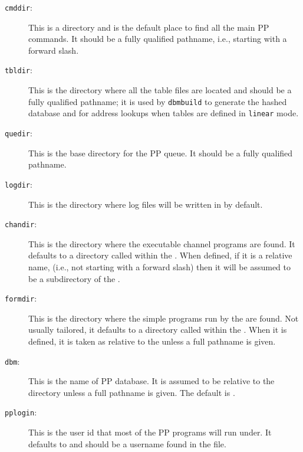 \begin{description}
\item[\verb+cmddir+:]
This is a directory and is the default place to find all the main PP
commands. It should be a fully qualified pathname, i.e., starting with
a forward slash.

\item[\verb+tbldir+:]
This is the directory where all the table files are located and should
be a fully qualified pathname; it is used by
\verb+dbmbuild+ to generate the hashed database and
for address lookups when tables are defined in
\verb+linear+ mode.

\item[\verb+quedir+:]
This is the base directory for the PP queue. It should be a fully
qualified pathname.

\item[\verb+logdir+:]
This is the directory where log files will be written in by default.


\item[\verb+chandir+:]
This is the directory where the executable channel programs are found.
It defaults to a directory called  within the
.  When defined, if it is a relative name, (i.e., not
starting with a forward slash) then it will be assumed to be a
subdirectory of the .

\item[\verb+formdir+:]
This is the directory where the simple programs run by the
 are found. Not usually tailored, it defaults to a
directory called  within the .
When it is defined, it is taken as
relative to the  unless a full pathname is given.

\item[\verb+dbm+:]
This is the name of PP database. It is assumed to be
relative to the  directory unless a full pathname is
given. The default is . 

\item[\verb+pplogin+:]
This is the user id that most of the PP programs will run under. It
defaults to  and  should be a username found in the
 file.


\end{description}
